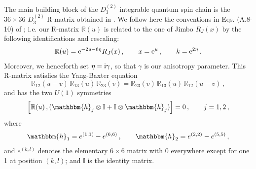 \documentclass[12pt]{article}
\numberwithin{equation}{section}
\newcommand{\ri}{{\rm i}}
\newcommand{\re}{{\rm e}}
\newcommand{\id}{\mathbb{I}}
\begin{document}
The main building block of the $D^{(2)}_3$ integrable quantum spin chain is the $36 \times 36$ $D^{(2)}_3$ R-matrix obtained in \cite{Jimb86}. We follow here the conventions in Eqs. (A.8-10) of \cite{NePR17}; i.e.
our R-matrix $\mathbb{R}(u)$ is related to the one of Jimbo $R_{J}(x)$ \cite{Jimb86} by the following identifications and rescaling:
\begin{align}
   \mathbb{R}(u)=\re^{-2u-6\eta}R_{J}(x)\,, \qquad  x=\re^u\,, \qquad k=\re^{2\eta} \,.
\end{align}
Moreover, we henceforth set $\eta = \ri \gamma$, 
so that  $\gamma$ is our anisotropy parameter.
This R-matrix satisfies the Yang-Baxter equation
\begin{equation}
   \mathbb{R}_{12}(u-v)\, \mathbb{R}_{13}(u)\, \mathbb{R}_{23}(v) = \mathbb{R}_{23}(v)\,
   \mathbb{R}_{13}(u)\, 
   \mathbb{R}_{12}(u-v)\,,
   \label{YBE}
\end{equation}
and has the two $U(1)$ symmetries
\begin{equation}
    \left[\mathbb{R}(u) \,, (\mathbbm{h}_j \otimes \id + \id \otimes \mathbbm{h}_j) \right] = 0 \,, \qquad j = 1, 2\,, 
    \label{RU1}
\end{equation}
where 
\begin{equation}
    \mathbbm{h}_1 = e^{(1,1)} - e^{(6,6)} \,, \qquad
    \mathbbm{h}_2 = e^{(2,2)} - e^{(5,5)} \,,
    \label{U1gens}
\end{equation}
and $e^{(k,l)}$ denotes the elementary $6 \times 6$ matrix with 0 everywhere except for one 1 at position $(k,l)$; and $\id$ is the identity matrix.
\end{document}
